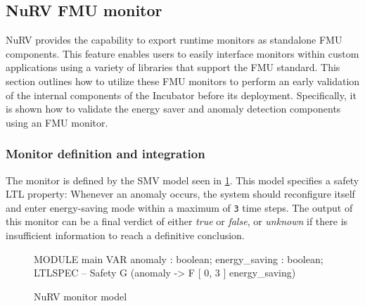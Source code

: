 \subsection{NuRV FMU monitor}\label{subsec:NuRVmoni}
NuRV provides the capability to export runtime monitors as standalone FMU components. This feature enables users to easily interface monitors within custom applications using a variety of libraries that support the FMU standard.
This section outlines how to utilize these FMU monitors to perform an early validation of the internal components of the Incubator before its deployment. Specifically, it is shown how to validate the energy saver and anomaly detection components using an FMU monitor.

\subsubsection{Monitor definition and integration}
The monitor is defined by the SMV model seen in \cref{fig:nurv_orbit_spec}. This model specifies a safety LTL property: Whenever an anomaly occurs, the system should reconfigure itself and enter energy-saving mode within a maximum of \texttt{3} time steps. The output of this monitor can be a final verdict of either \textit{true} or \textit{false}, or \textit{unknown} if there is insufficient information to reach a definitive conclusion.

\begin{figure}[ht]
	\begin{textcode}
		MODULE main
		VAR
			anomaly : boolean;
			energy_saving : boolean;
		LTLSPEC -- Safety
			G (anomaly -> F [ 0, 3 ] energy_saving)
	\end{textcode}
	\caption{NuRV monitor model}
	\label{fig:nurv_orbit_spec}
\end{figure}%


